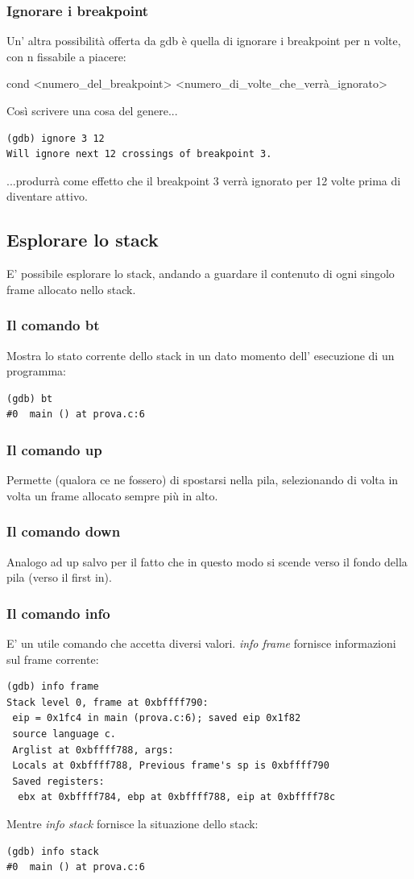 \documentclass[a4paper,12pt]{article} %
\begin{document}
\subsubsection{Ignorare i breakpoint}
Un' altra possibilità offerta da gdb è quella di ignorare i breakpoint per n volte, con n fissabile a piacere:
\begin{center}
cond <numero\_del\_breakpoint> <numero\_di\_volte\_che\_verrà\_ignorato>
\end{center}
Così scrivere una cosa del genere...
\begin{lstlisting}
(gdb) ignore 3 12
Will ignore next 12 crossings of breakpoint 3.
\end{lstlisting}
...produrrà come effetto che il breakpoint 3 verrà ignorato per 12 volte prima di diventare attivo.
\subsection{Esplorare lo stack}
E' possibile esplorare lo stack, andando a guardare il contenuto di ogni singolo frame allocato nello stack.
\subsubsection{Il comando bt}
Mostra lo stato corrente dello stack in un dato momento dell' esecuzione di un programma:
\begin{lstlisting}
(gdb) bt
#0  main () at prova.c:6
\end{lstlisting}
\subsubsection{Il comando up}
Permette (qualora ce ne fossero) di spostarsi nella pila, selezionando di volta in volta un frame allocato sempre più in alto.
\subsubsection{Il comando down}
Analogo ad up salvo per il fatto che in questo modo si scende verso il fondo della pila (verso il first in).
\subsubsection{Il comando info}
E' un utile comando che accetta diversi valori. \textit{info frame} fornisce informazioni sul frame corrente:
\begin{lstlisting}
(gdb) info frame
Stack level 0, frame at 0xbffff790:
 eip = 0x1fc4 in main (prova.c:6); saved eip 0x1f82
 source language c.
 Arglist at 0xbffff788, args: 
 Locals at 0xbffff788, Previous frame's sp is 0xbffff790
 Saved registers:
  ebx at 0xbffff784, ebp at 0xbffff788, eip at 0xbffff78c
\end{lstlisting}
Mentre \textit{info stack} fornisce la situazione dello stack:
\begin{lstlisting}
(gdb) info stack
#0  main () at prova.c:6
\end{lstlisting}
\end{document}
